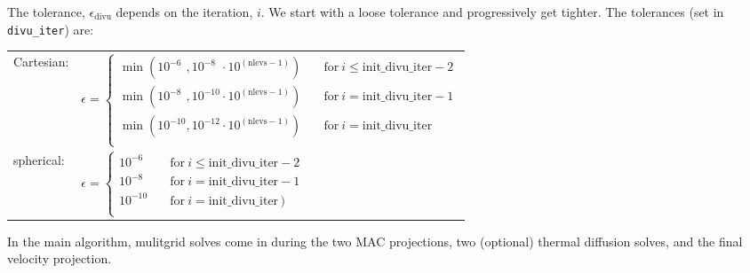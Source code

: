 \begin{itemize}
  The tolerance, $\epsilon_\mathrm{divu}$ depends on the iteration, $i$.
  We start with a loose tolerance and progressively get tighter.  The
  tolerances (set in {\tt divu\_iter}) are:
   \begin{center}
   \begin{tabular}{ll}
   Cartesian:   & $\epsilon = \left  \{ \begin{array}{ll} 
                   \min  (10^{-6\phantom{0}}, 10^{-8\phantom{0}} \cdot 10^{(\mathrm{nlevs - 1})} ) & 
                           \quad \mathrm{for}~ i \le \mathrm{init\_divu\_iter} - 2 \\
                   \min  (10^{-8\phantom{0}}, 10^{-10} \cdot 10^{(\mathrm{nlevs - 1})} ) & 
                           \quad \mathrm{for}~ i = \mathrm{init\_divu\_iter} - 1  \\
                   \min  (10^{-10}, 10^{-12} \cdot 10^{(\mathrm{nlevs - 1})} ) & 
                           \quad \mathrm{for}~ i = \mathrm{init\_divu\_iter}   \\
                                 \end{array}
                  \right .$ \\[10mm]
   spherical:   & $\epsilon = \left  \{ \begin{array}{ll} 
                    10^{-6\phantom{0}}  &
                           \quad \mathrm{for}~ i \le \mathrm{init\_divu\_iter} - 2 \, \\
                    10^{-8\phantom{0}}  &
                           \quad \mathrm{for}~ i = \mathrm{init\_divu\_iter} - 1 \, \\
                    10^{-10}  &
                           \quad \mathrm{for}~ i = \mathrm{init\_divu\_iter} \, )\\
                  \end{array}
                  \right .$ \\
   \end{tabular}
   \end{center}


\end{itemize}

In the main algorithm, mulitgrid solves come in during the two MAC projections,
two (optional) thermal diffusion solves, and the final velocity projection.

